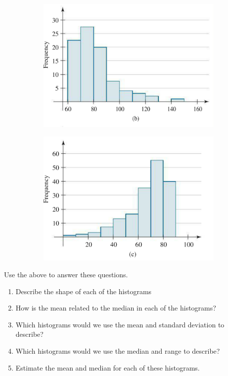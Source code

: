 \documentclass[12pt]{scrartcl}
\theoremstyle{definition}
\begin{document}
\begin{figure}[h!]
\centering
\begin{subfigure}{.5\textwidth}
  \centering
  \includegraphics[scale=0.45]{RevSec413}
\end{subfigure}%
\begin{subfigure}{.5\textwidth}
  \centering
  \includegraphics[scale=0.45]{RevSec414}
\end{subfigure}
\end{figure}

\noindent
Use the above to answer these questions.
\begin{enumerate}
	\item Describe the shape of each of the histograms
	\item How is the mean related to the median in each of the histograms?
	\item Which histograms would we use the mean and standard deviation to describe?
	\item Which histograms would we use the median and range to describe?
	\item Estimate the mean and median for each of these histograms.
\end{enumerate}
\end{document}
